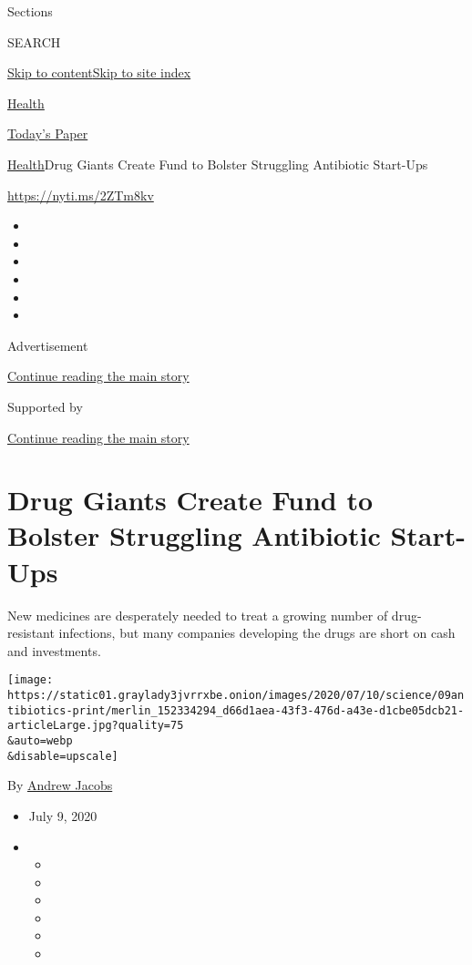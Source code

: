 Sections

SEARCH

\protect\hyperlink{site-content}{Skip to
content}\protect\hyperlink{site-index}{Skip to site index}

\href{https://www.nytimes3xbfgragh.onion/section/health}{Health}

\href{https://myaccount.nytimes3xbfgragh.onion/auth/login?response_type=cookie\&client_id=vi}{}

\href{https://www.nytimes3xbfgragh.onion/section/todayspaper}{Today's
Paper}

\href{/section/health}{Health}\textbar{}Drug Giants Create Fund to
Bolster Struggling Antibiotic Start-Ups

\url{https://nyti.ms/2ZTm8kv}

\begin{itemize}
\item
\item
\item
\item
\item
\item
\end{itemize}

Advertisement

\protect\hyperlink{after-top}{Continue reading the main story}

Supported by

\protect\hyperlink{after-sponsor}{Continue reading the main story}

\hypertarget{drug-giants-create-fund-to-bolster-struggling-antibiotic-start-ups}{%
\section{Drug Giants Create Fund to Bolster Struggling Antibiotic
Start-Ups}\label{drug-giants-create-fund-to-bolster-struggling-antibiotic-start-ups}}

New medicines are desperately needed to treat a growing number of
drug-resistant infections, but many companies developing the drugs are
short on cash and investments.

\texttt{[image: https://static01.graylady3jvrrxbe.onion/images/2020/07/10/science/09antibiotics-print/merlin\_152334294\_d66d1aea-43f3-476d-a43e-d1cbe05dcb21-articleLarge.jpg?quality=75\\\&auto=webp\\\&disable=upscale]}

By \href{https://www.nytimes3xbfgragh.onion/by/andrew-jacobs}{Andrew
Jacobs}

\begin{itemize}
\item
  July 9, 2020
\item
  \begin{itemize}
  \item
  \item
  \item
  \item
  \item
  \item
  \end{itemize}
\end{itemize}

